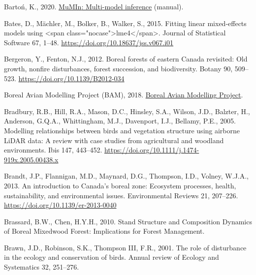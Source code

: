 \documentclass[
  12pt,
]{article}
\newlength{\cslhangindent}
\newlength{\cslentryspacingunit} %
\newenvironment{CSLReferences}[2] %
 {%
  \setlength{\parindent}{0pt}
  \ifodd #1
  \let\oldpar\par
  \def\par{\hangindent=\cslhangindent\oldpar}
  \fi
  \setlength{\parskip}{#2\cslentryspacingunit}
 }%
 {}
\begin{document}
\begin{CSLReferences}{1}{0}
\leavevmode{}%
Bartoń, K., 2020. \href{https://CRAN.R-project.org/package=MuMIn}{{MuMIn}: {Multi}-model inference} (manual).

\leavevmode{}%
Bates, D., Mächler, M., Bolker, B., Walker, S., 2015. Fitting linear mixed-effects models using {\textless{}}span class="nocase"{\textgreater{}}lme4{\textless{}}/span{\textgreater{}}. Journal of Statistical Software 67, 1--48. \url{https://doi.org/10.18637/jss.v067.i01}

\leavevmode{}%
Bergeron, Y., Fenton, N.J., 2012. Boreal forests of eastern {Canada} revisited: {Old} growth, nonfire disturbances, forest succession, and biodiversity. Botany 90, 509--523. \url{https://doi.org/10.1139/B2012-034}

\leavevmode{}%
Boreal Avian Modelling Project (BAM), 2018. \href{http://www.borealbirds.ca/}{Boreal {Avian} {Modelling} {Project}}.

\leavevmode{}%
Bradbury, R.B., Hill, R.A., Mason, D.C., Hinsley, S.A., Wilson, J.D., Balzter, H., Anderson, G.Q.A., Whittingham, M.J., Davenport, I.J., Bellamy, P.E., 2005. Modelling relationships between birds and vegetation structure using airborne {LiDAR} data: A review with case studies from agricultural and woodland environments. Ibis 147, 443--452. \url{https://doi.org/10.1111/j.1474-919x.2005.00438.x}

\leavevmode{}%
Brandt, J.P., Flannigan, M.D., Maynard, D.G., Thompson, I.D., Volney, W.J.A., 2013. An introduction to {Canada}'s boreal zone: {Ecosystem} processes, health, sustainability, and environmental issues. Environmental Reviews 21, 207--226. \url{https://doi.org/10.1139/er-2013-0040}

\leavevmode{}%
Brassard, B.W., Chen, H.Y.H., 2010. Stand {Structure} and {Composition} {Dynamics} of {Boreal} {Mixedwood} {Forest}: {Implications} for {Forest} {Management}.

\leavevmode{}%
Brawn, J.D., Robinson, S.K., Thompson III, F.R., 2001. The role of disturbance in the ecology and conservation of birds. Annual review of Ecology and Systematics 32, 251--276.


\end{CSLReferences}
\end{document}
